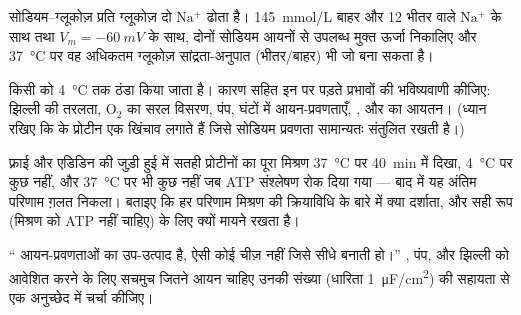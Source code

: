 \begin{exercise}[$\star\star$]\label{exo:b1:membranes-transport:9}
सोडियम--ग्लूकोज़  प्रति ग्लूकोज़ दो $\mathrm{Na^+}$ ढोता है।
\qty{145}{mmol/L} बाहर और \qty{12}{} भीतर वाले $\mathrm{Na^+}$ के साथ
तथा $V_m = \qty{-60}{mV}$ के साथ, दोनों सोडियम आयनों से उपलब्ध मुक्त
ऊर्जा निकालिए और \qty{37}{\celsius} पर वह अधिकतम ग्लूकोज़
सांद्रता-अनुपात (भीतर/बाहर) भी जो  बना सकता है।
\end{exercise}

\begin{exercise}[$\star\star\star$]\label{exo:b1:membranes-transport:10}
किसी  को \qty{4}{\celsius} तक ठंडा किया जाता है। कारण सहित इन पर
पड़ते प्रभावों की भविष्यवाणी कीजिए: झिल्ली की तरलता, $\mathrm{O_2}$ का
सरल विसरण, पंप, घंटों में आयन-प्रवणताएँ, , और  का
आयतन। (ध्यान रखिए कि  के प्रोटीन एक  खिंचाव लगाते हैं जिसे
सोडियम प्रवणता सामान्यतः संतुलित रखती है।)
\end{exercise}

\begin{exercise}[$\star\star\star$]\label{exo:b1:membranes-transport:11}
फ़्राई और एडिडिन की जुड़ी हुई  में सतही प्रोटीनों का पूरा मिश्रण
\qty{37}{\celsius} पर \qty{40}{min} में दिखा, \qty{4}{\celsius} पर कुछ
नहीं, और \qty{37}{\celsius} पर भी कुछ नहीं जब ATP संश्लेषण रोक दिया गया
--- बाद में यह अंतिम परिणाम ग़लत निकला। बताइए कि हर परिणाम मिश्रण की
क्रियाविधि के बारे में क्या दर्शाता, और सही रूप (मिश्रण को ATP नहीं
चाहिए)  के लिए क्यों मायने रखता है।
\end{exercise}

\begin{exercise}[$\star\star\star$]\label{exo:b1:membranes-transport:12}
`` आयन-प्रवणताओं का उप-उत्पाद है, ऐसी कोई चीज़ नहीं जिसे
 सीधे बनाती हो।'' , पंप, और झिल्ली को आवेशित करने
के लिए सचमुच जितने आयन चाहिए उनकी संख्या (धारिता
\qty{1}{\micro F/cm^2}) की सहायता से एक अनुच्छेद में चर्चा कीजिए।
\end{exercise}

